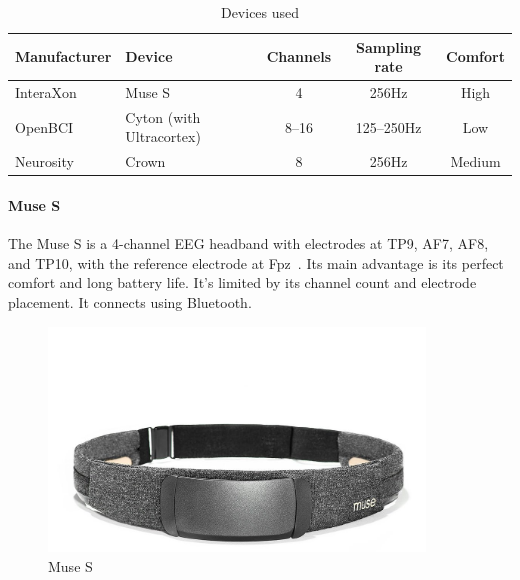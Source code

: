     \begin{table}[H]
        \centering
        \begin{tabular}{llccc}
            \toprule
            Manufacturer
            & Device
            & Channels
            & Sampling rate
            & Comfort
            \\
            \midrule
            InteraXon
            & Muse S
            & 4
            & 256Hz
            & High \\
         OpenBCI
            & Cyton (with Ultracortex)
            & 8--16
            & 125--250Hz
            & Low \\
          Neurosity
            & Crown
            & 8
            & 256Hz
            & Medium \\
            \bottomrule
        \end{tabular}
        \caption{Devices used}\label{table:devices}
    \end{table}

    \vspace{0.5cm}

    \begin{minipage}{\textwidth}
        \paragraph*{Muse S}
        The Muse S is a 4-channel EEG headband with electrodes at TP9, AF7, AF8, and TP10, with the reference electrode at Fpz~\cite{krigolson_choosing_2017}. Its main advantage is its perfect comfort and long battery life. It's limited by its channel count and electrode placement. It connects using Bluetooth.

        \begin{figure}[H]
            \centering
            \includegraphics[trim=0 0 0 200,clip,width=100mm]{img/Muse-S.jpg}
            \caption{Muse S}\label{fig:museS}
        \end{figure}
    \end{minipage}

